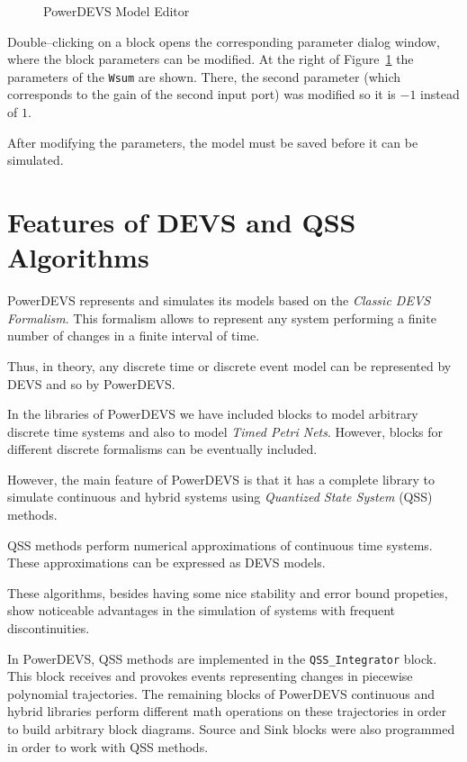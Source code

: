 \begin{figure}[h]
 \caption{PowerDEVS Model Editor}
 \label{fig:pdmodeling}
\end{figure}

Double--clicking on a block opens the corresponding parameter dialog window, where the block parameters can be modified. At the right of Figure~\ref{fig:pdmodeling} the parameters of the \verb"Wsum" are shown. There, the second parameter (which corresponds to the gain of the second input port) was modified so it is $-1$ instead of $1$.

After modifying the parameters, the model must be saved before it can be simulated. 

\section{Features of DEVS and QSS Algorithms}
PowerDEVS represents and simulates its models based on the \emph{Classic DEVS Formalism}. This formalism allows to represent any system performing a finite number of changes in a finite interval of time.

Thus, in theory, any discrete time or discrete event model can be represented by DEVS and so by PowerDEVS.

In the libraries of PowerDEVS we have included blocks to model arbitrary discrete time systems and also to model \emph{Timed Petri Nets}. However, blocks for different discrete formalisms can be eventually included.

However, the main feature of PowerDEVS is that it has a complete library to simulate continuous and hybrid systems using \emph{Quantized State System} (QSS) methods.

QSS methods perform numerical approximations of continuous time systems. These approximations can be expressed as DEVS models.

These algorithms, besides having some nice stability and error bound propeties, show noticeable advantages in the simulation of systems with frequent discontinuities.

In PowerDEVS, QSS methods are implemented in the \verb"QSS_Integrator" block. This block receives and provokes events representing changes in piecewise polynomial trajectories. The remaining blocks of PowerDEVS continuous and hybrid libraries perform different math operations on these trajectories in order to build arbitrary block diagrams. Source and Sink blocks were also programmed in order to work with QSS methods. 



